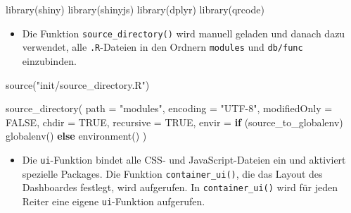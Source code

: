 \documentclass[
]{article}
\newenvironment{Shaded}{\begin{snugshade}}{\end{snugshade}}
\newcommand{\AttributeTok}[1]{\textcolor[rgb]{0.77,0.63,0.00}{#1}}
\newcommand{\ConstantTok}[1]{\textcolor[rgb]{0.00,0.00,0.00}{#1}}
\newcommand{\ControlFlowTok}[1]{\textcolor[rgb]{0.13,0.29,0.53}{\textbf{#1}}}
\newcommand{\FunctionTok}[1]{\textcolor[rgb]{0.00,0.00,0.00}{#1}}
\newcommand{\NormalTok}[1]{#1}
\newcommand{\StringTok}[1]{\textcolor[rgb]{0.31,0.60,0.02}{#1}}
\providecommand{\tightlist}{%
  \setlength{\itemsep}{0pt}\setlength{\parskip}{0pt}}
\begin{document}
\begin{Shaded}
\begin{Highlighting}[]
\FunctionTok{library}\NormalTok{(shiny)}
\FunctionTok{library}\NormalTok{(shinyjs)}
\FunctionTok{library}\NormalTok{(dplyr)}
\FunctionTok{library}\NormalTok{(qrcode)}
\end{Highlighting}
\end{Shaded}

\begin{itemize}
\tightlist
\item
  Die Funktion \texttt{source\_directory()} wird manuell geladen und danach dazu verwendet, alle \texttt{.R}-Dateien in den Ordnern \texttt{modules} und \texttt{db/func} einzubinden.
\end{itemize}

\begin{Shaded}
\begin{Highlighting}[]
\FunctionTok{source}\NormalTok{(}\StringTok{"init/source\_directory.R"}\NormalTok{)}

\FunctionTok{source\_directory}\NormalTok{(}
    \AttributeTok{path =} \StringTok{"modules"}\NormalTok{,}
    \AttributeTok{encoding =} \StringTok{"UTF{-}8"}\NormalTok{,}
    \AttributeTok{modifiedOnly =} \ConstantTok{FALSE}\NormalTok{,}
    \AttributeTok{chdir =} \ConstantTok{TRUE}\NormalTok{,}
    \AttributeTok{recursive =} \ConstantTok{TRUE}\NormalTok{,}
    \AttributeTok{envir =} \ControlFlowTok{if}\NormalTok{ (source\_to\_globalenv) }\FunctionTok{globalenv}\NormalTok{() }\ControlFlowTok{else} \FunctionTok{environment}\NormalTok{()}
\NormalTok{)}
\end{Highlighting}
\end{Shaded}

\begin{itemize}
\tightlist
\item
  Die \texttt{ui}-Funktion bindet alle CSS- und JavaScript-Dateien ein und aktiviert spezielle Packages. Die Funktion \texttt{container\_ui()}, die das Layout des Dashboardes festlegt, wird aufgerufen. In \texttt{container\_ui()} wird für jeden Reiter eine eigene \texttt{ui}-Funktion aufgerufen.
\end{itemize}
\end{document}
